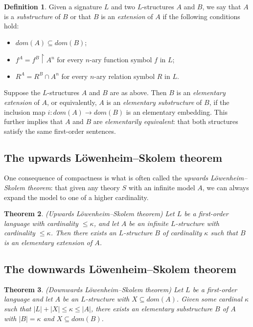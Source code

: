 \documentclass[10pt, a4paper, oneside]{article}
\newtheorem{thm}{Theorem}[section]
\theoremstyle{definition}
\newtheorem{dfn}[thm]{Definition}
\theoremstyle{remark}
\theoremstyle{plain}
\begin{document}
\begin{dfn}
    Given a signature $L$ and two $L$-structures $A$ and $B$, we say that
    $A$ is a \emph{substructure} of $B$ or that $B$ is an \emph{extension} of
    $A$ if the following conditions hold:
    
    \begin{itemize}
        \item $dom(A) \subseteq dom(B)$;
        \item $f^A = f^B \restriction A^n$ for every $n$-ary function symbol $f$
            in $L$;
        \item $R^A = R^B \cap A^n$ for every $n$-ary relation symbol $R$
            in $L$.
    \end{itemize}
    
    Suppose the $L$-structures $A$ and $B$ are as above. Then $B$ is an
    \emph{elementary extension} of $A$, or equivalently, $A$ is an
    \emph{elementary substructure} of $B$, if the inclusion map $i : dom(A)
    \rightarrow dom(B)$ is an elementary embedding. This further implies that
    $A$ and $B$ are \emph{elementarily equivalent}: that both structures satisfy
    the same first-order sentences.
\end{dfn}

\subsection{The upwards Löwenheim--Skolem theorem}

One consequence of compactness is what is often called the \emph{upwards
Löwenheim--Skolem theorem}: that given any theory $S$ with an infinite model
$A$, we can always expand the model to one of a higher cardinality.

\begin{thm}
    (Upwards Löwenheim--Skolem theorem) Let $L$ be a first-order language with
    cardinality $\leq \kappa$, and let $A$ be an infinite $L$-structure with
    cardinality $\leq \kappa$. Then there exists an $L$-structure $B$ of
    cardinality $\kappa$ such that $B$ is an elementary extension of $A$.
\end{thm}

\subsection{The downwards Löwenheim--Skolem theorem}

\begin{thm}
    (Downwards Löwenheim--Skolem theorem) Let $L$ be a first-order language and
    let $A$ be an $L$-structure with $X \subseteq dom(A)$. Given some cardinal
    $\kappa$ such that $|L| + |X| \leq \kappa \leq |A|$, there exists an
    elementary substructure $B$ of $A$ with $|B| = \kappa$ and
    $X \subseteq dom(B)$.
\end{thm}
\end{document}
